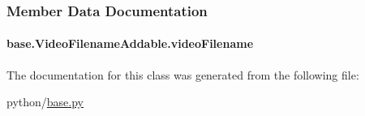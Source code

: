 \subsubsection{Member Data Documentation}
\hypertarget{classbase_1_1VideoFilenameAddable_a18e866ee528801e5100b8e712d3a4f35}{
\paragraph[{video\-Filename}]{\setlength{\rightskip}{0pt plus 5cm}base.\-Video\-Filename\-Addable.\-video\-Filename}}\label{classbase_1_1VideoFilenameAddable_a18e866ee528801e5100b8e712d3a4f35}


The documentation for this class was generated from the following file\-:\begin{DoxyCompactItemize}
\item 
python/\hyperlink{base_8py}{base.\-py}\end{DoxyCompactItemize}
